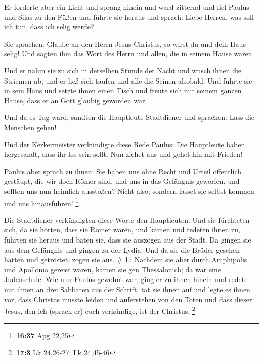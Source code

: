  Er forderte aber ein Licht und sprang hinein und ward
zitternd und fiel Paulus und Silas zu den Füßen  und
führte sie heraus und sprach: Liebe Herren, was soll ich tun, dass ich
selig werde?

 Sie sprachen: Glaube an den Herrn Jesus Christus, so
wirst du und dein Haus selig!  Und sagten ihm das Wort
des Herrn und allen, die in seinem Hause waren.

 Und er nahm sie zu sich in derselben Stunde der Nacht
und wusch ihnen die Striemen ab; und er ließ sich taufen und alle die
Seinen alsobald.  Und führte sie in sein Haus und setzte
ihnen einen Tisch und freute sich mit seinem ganzen Hause, dass er an
Gott gläubig geworden war.

 Und da es Tag ward, sandten die Hauptleute Stadtdiener
und sprachen: Lass die Menschen gehen!

 Und der Kerkermeister verkündigte diese Rede Paulus: Die
Hauptleute haben hergesandt, dass ihr los sein sollt. Nun ziehet aus und
gehet hin mit Frieden!

 Paulus aber sprach zu ihnen: Sie haben uns ohne Recht
und Urteil öffentlich gestäupt, die wir doch Römer sind, und uns in das
Gefängnis geworfen, und sollten uns nun heimlich ausstoßen? Nicht also;
sondern lasset sie selbst kommen und uns hinausführen! \footnote{\textbf{16:37}
  Apg 22,25}

 Die Stadtdiener verkündigten diese Worte den
Hauptleuten. Und sie fürchteten sich, da sie hörten, dass sie Römer
wären,  und kamen und redeten ihnen zu, führten sie
heraus und baten sie, dass sie auszögen aus der Stadt. 
Da gingen sie aus dem Gefängnis und gingen zu der Lydia. Und da sie die
Brüder gesehen hatten und getröstet, zogen sie aus. \# 17 
Nachdem sie aber durch Amphipolis und Apollonia gereist waren, kamen sie
gen Thessalonich; da war eine Judenschule.  Wie nun Paulus
gewohnt war, ging er zu ihnen hinein und redete mit ihnen an drei
Sabbaten aus der Schrift,  tat sie ihnen auf und legte es
ihnen vor, dass Christus musste leiden und auferstehen von den Toten und
dass dieser Jesus, den ich (sprach er) euch verkündige, ist der
Christus. \footnote{\textbf{17:3} Lk 24,26-27; Lk 24,45-46}


